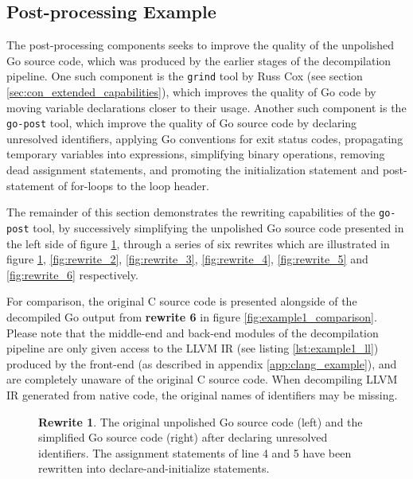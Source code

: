 
\subsection{Post-processing Example}
\label{app:post-processing_example}

The post-processing components seeks to improve the quality of the unpolished Go source code, which was produced by the earlier stages of the decompilation pipeline. One such component is the \texttt{grind} tool by Russ Cox (see section \ref{sec:con_extended_capabilities}), which improves the quality of Go code by moving variable declarations closer to their usage. Another such component is the \texttt{go-post} tool, which improve the quality of Go source code by declaring unresolved identifiers, applying Go conventions for exit status codes, propagating temporary variables into expressions, simplifying binary operations, removing dead assignment statements, and promoting the initialization statement and post-statement of for-loops to the loop header.

The remainder of this section demonstrates the rewriting capabilities of the \texttt{go-post} tool, by successively simplifying the unpolished Go source code presented in the left side of figure \ref{fig:rewrite_1}, through a series of six rewrites which are illustrated in figure \ref{fig:rewrite_1}, \ref{fig:rewrite_2}, \ref{fig:rewrite_3}, \ref{fig:rewrite_4}, \ref{fig:rewrite_5} and \ref{fig:rewrite_6} respectively.

For comparison, the original C source code is presented alongside of the decompiled Go output from \textbf{rewrite 6} in figure \ref{fig:example1_comparison}. Please note that the middle-end and back-end modules of the decompilation pipeline are only given access to the LLVM IR (see listing \ref{lst:example1_ll}) produced by the front-end (as described in appendix \ref{app:clang_example}), and are completely unaware of the original C source code. When decompiling LLVM IR generated from native code, the original names of identifiers may be missing.

\begin{figure}[htbp]
	\centering
	\begin{subfigure}[t]{0.45\textwidth}
		
	\end{subfigure}
	\qquad
	\begin{subfigure}[t]{0.45\textwidth}
		
	\end{subfigure}
	\caption{\textbf{Rewrite 1}. The original unpolished Go source code (left) and the simplified Go source code (right) after declaring unresolved identifiers. The assignment statements of line 4 and 5 have been rewritten into declare-and-initialize statements.}
	\label{fig:rewrite_1}
\end{figure}

